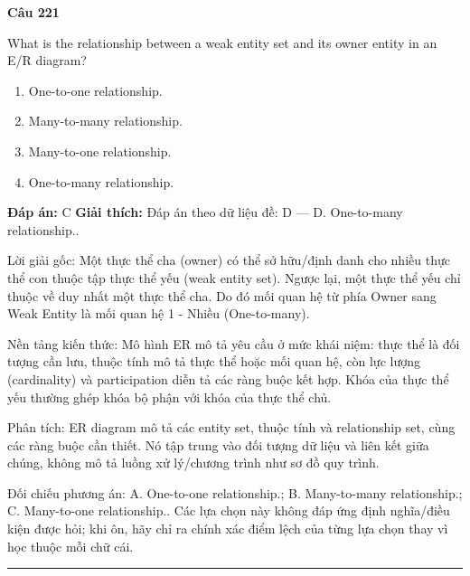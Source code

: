 \documentclass[11pt,a4paper]{article}
\newenvironment{question}[1]{%
  \par\vspace{1em}\noindent\textbf{\large Câu #1}\par\vspace{0.4em}
}{%
  \par\vspace{1em}\hrule\vspace{0.6em}
}
\newenvironment{choices}{%
  \begin{enumerate}[label=\textbf{\Alph*.},leftmargin=2.2em,itemsep=2pt,topsep=3pt]
}{%
  \end{enumerate}
}
\newcommand{\choice}{\item}
\begin{document}
\begin{question}{221}
What is the relationship between a weak entity set and its owner entity in an E/R diagram?
\begin{choices}
\choice One-to-one relationship.
\choice Many-to-many relationship.
\choice Many-to-one relationship.
\choice One-to-many relationship.
\end{choices}
\textbf{Đáp án:} C
\textbf{Giải thích:} Đáp án theo dữ liệu đề: D — D. One-to-many relationship..

Lời giải gốc: Một thực thể cha (owner) có thể sở hữu/định danh cho nhiều thực thể con thuộc tập thực thể yếu (weak entity set). Ngược lại, một thực thể yếu chỉ thuộc về duy nhất một thực thể cha. Do đó mối quan hệ từ phía Owner sang Weak Entity là mối quan hệ 1 - Nhiều (One-to-many).

Nền tảng kiến thức: Mô hình ER mô tả yêu cầu ở mức khái niệm: thực thể là đối tượng cần lưu, thuộc tính mô tả thực thể hoặc mối quan hệ, còn lực lượng (cardinality) và participation diễn tả các ràng buộc kết hợp. Khóa của thực thể yếu thường ghép khóa bộ phận với khóa của thực thể chủ.

Phân tích: ER diagram mô tả các entity set, thuộc tính và relationship set, cùng các ràng buộc cần thiết. Nó tập trung vào đối tượng dữ liệu và liên kết giữa chúng, không mô tả luồng xử lý/chương trình như sơ đồ quy trình.

Đối chiếu phương án: A. One-to-one relationship.; B. Many-to-many relationship.; C. Many-to-one relationship.. Các lựa chọn này không đáp ứng định nghĩa/điều kiện được hỏi; khi ôn, hãy chỉ ra chính xác điểm lệch của từng lựa chọn thay vì học thuộc mỗi chữ cái.
\end{question}
\end{document}
